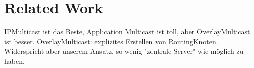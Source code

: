 \chapter{Related Work}
\label{chap:related}

IPMulticast ist das Beste, Application Multicast ist toll, aber OverlayMulticast ist besser. OverlayMulticast: explizites Erstellen von RoutingKnoten. Widerspricht aber unserem Ansatz, so wenig "zentrale Server" wie möglich zu haben.\cite{Lao2005Comparative}








